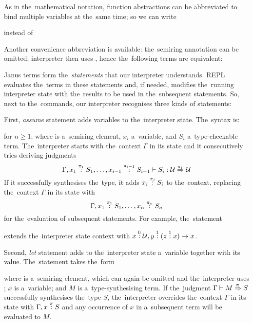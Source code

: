 As in the~mathematical notation, function abstractions can be abbreviated to
bind multiple variables at the~same time; so we can write
\begin{center}
   \hspace{3em} instead of
  \hspace{3em} 
\end{center}

Another convenience abbreviation is available: the~semiring annotation can be
omitted; interpreter then uses \quant{$\omega$}, hence the~following terms are
equivalent:
\begin{center}
   \hspace{6em}
\end{center}

Janus terms form the~\emph{statements} that our interpreter understands. REPL
evaluates the~terms in these statements and, if needed, modifies the~running
interpreter state with the~results to be used in the~subsequent statements. So,
next to the~commands, our interpreter recognises three kinds of statements:

First, \emph{assume} statement adds variables to the~interpreter state.
The~syntax is:
\begin{center}
\end{center}
for $n \geq 1$; where  is a~semiring element, $x_i$ a~variable,
and $S_i$ a~type-checkable term. The~interpreter starts with the~context
$\Gamma$ in its state and it consecutively tries deriving judgments
\[
  \Gamma, x_1 \overset{\pi_1}: S_1, \dots, x_{i-1} \overset{\pi_{i-1}}: S_{i-1} \vdash
  S_i \overset{}: \mathcal{U} \overset{\!{\pi_i}}\Rightarrow \mathcal{U}
\]
If it successfully synthesises the~type, it adds $x_i \overset{\pi_i}: S_i$ to
the~context, replacing the~context $\Gamma$ in its state with
\[
  \Gamma, x_1 \overset{\pi_1}: S_1, \dots, x_n \overset{\pi_n}: S_n
\]
for the~evaluation of subsequent statements. For example, the~statement
\begin{center}
\end{center}
extends the~interpreter state context with $x \overset{0}: \mathcal{U}, y \overset{1}: (z \overset{1}: x) \to x$.

Second, \emph{let} statement adds to the~interpreter state a~variable together
with its value. The~statement takes the~form
\begin{center}
\end{center}
where \quant{$\pi$} is a~semiring element, which can again be omitted and
the~interpreter uses \quant{$\omega$}; $x$ is a~variable; and $M$ is
a~type-synthesising term. If the~judgment $\Gamma \vdash M \overset{\!{\pi}}\Rightarrow S$
successfully synthesises the~type $S$, the~interpreter overrides the~context
$\Gamma$ in its state with $\Gamma, x \overset{\pi}: S$ and any occurrence of $x$ in
a~subsequent term will be evaluated to $M$.

